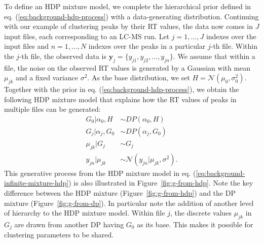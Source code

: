 To define an HDP mixture model, we complete the hierarchical prior defined in eq. (\ref{eq:background-hdp-process}) with a data-generating distribution. Continuing with our example of clustering peaks by their RT values, the data now comes in $J$ input files, each corresponding to an LC-MS run. Let $j=1,...,J$ indexes over the input files and $n=1,...,N$ indexes over the peaks in a particular $j$-th file. Within the $j$-th file, the observed data is $\boldsymbol{y}_j=\{y_{j1}, y_{j2}, ..., y_{jn}\}$. We assume that within a file, the noise on the observed RT values is generated by a Gaussian with mean $\mu_{jk}$ and a fixed variance $\sigma^2$. As the base distribution, we set $H=\mathcal{N}(\mu_0, \sigma_0^2)$. Together with the prior in eq. (\ref{eq:background-hdp-process}), we obtain the following HDP mixture model that explains how the RT values of peaks in multiple files can be generated:
\begin{equation}
\begin{aligned}
G_0 \vert \alpha_0, H &\sim DP(\alpha_0, H) \\
G_j \vert \alpha_j, G_0 &\sim DP(\alpha_j, G_0) \\
\mu_{jk} \vert G_j               &\sim G_j \\
y_{jn} \vert \mu_{jk}           &\sim \mathcal{N}(y_{jn} \vert \mu_{jk}, \sigma^2).
\end{aligned}
\label{eq:background-infinite-mixture-hdp}
\end{equation}
This generative process from the HDP mixture model in eq. (\ref{eq:background-infinite-mixture-hdp}) is also illustrated in Figure~\ref{fig:g-from-hdp}. Note the key difference between the HDP mixture (Figure~\ref{fig:g-from-hdp}) and the DP mixture (Figure~\ref{fig:g-from-dp}). In particular note the addition of another level of hierarchy to the HDP mixture model. Within file $j$, the discrete values $\mu_{jk}$ in $G_{j}$ are drawn from another DP having $G_{0}$ as its base. This makes it possible for clustering parameters to be shared. 

